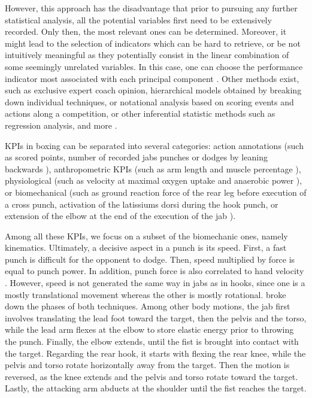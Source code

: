 However, this approach has the disadvantage that prior to pursuing any further statistical analysis, all the potential variables first need to be extensively recorded. Only then, the most relevant ones can be determined. Moreover, it might lead to the selection of indicators which can be hard to retrieve, or be not intuitively meaningful as they potentially consist in the linear combination of some seemingly unrelated variables. In this case, one can choose the performance indicator most associated with each principal component \cite{ODonoghue2008}. Other methods exist, such as exclusive expert coach opinion, hierarchical models obtained by breaking down individual techniques, or notational analysis based on scoring events and actions along a competition, or other inferential statistic methods such as regression analysis, and more \cite{Hughes2002,Butterworth2013}.

KPIs in boxing can be separated into several categories: action annotations (such as scored points, number of recorded jabs punches or dodges by leaning backwards \cite{Thomson2013}), anthropometric KPIs (such as arm length and muscle percentage \cite{Chaabene2015}), physiological (such as velocity at maximal oxygen uptake and anaerobic power \cite{Chaabene2015}), or biomechanical (such as ground reaction force of the rear leg before execution of a cross punch, activation of the latissiums dorsi during the hook punch, or extension of the elbow at the end of the execution of the jab \cite{Lenetsky2020}). 

Among all these KPIs, we focus on a subset of the biomechanic ones, namely kinematics. Ultimately, a decisive aspect in a punch is its speed. First, a fast punch is difficult for the opponent to dodge. Then, speed multiplied by force is equal to punch power. In addition, punch force is also correlated to hand velocity \cite{Mack2010}. However, speed is not generated the same way in jabs as in hooks, since one is a mostly translational movement whereas the other is mostly rotational. \cite{Lenetsky2020} broke down the phases of both techniques. Among other body motions, the jab first involves translating the lead foot toward the target, then the pelvis and the torso, while the lead arm flexes at the elbow to store elastic energy prior to throwing the punch. Finally, the elbow extends, until the fist is brought into contact with the target. Regarding the rear hook, it starts with flexing the rear knee, while the pelvis and torso rotate horizontally away from the target. Then the motion is reversed, as the knee extends and the pelvis and torso rotate toward the target. Lastly, the attacking arm abducts at the shoulder until the fist reaches the target. 


